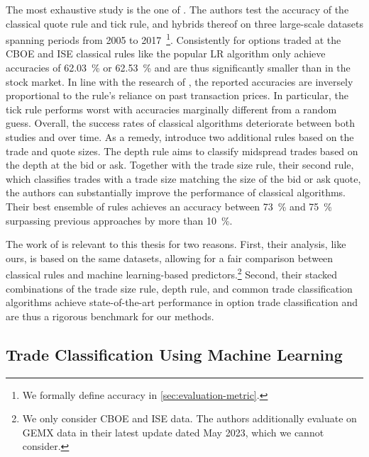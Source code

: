 The most exhaustive study is the one of \textcite[\checkmark][1--53]{grauerOptionTradeClassification2022}. The authors test the accuracy of the classical quote rule and tick rule, and hybrids thereof on three large-scale datasets spanning periods from 2005 to 2017~\footnote{We formally define accuracy in \cref{sec:evaluation-metric}.}. Consistently for options traded at the \gls{CBOE} and \gls{ISE} classical rules like the popular \gls{LR}  algorithm only achieve accuracies of \SI{62.03}{\percent} or \SI{62.53}{\percent} and are thus significantly smaller than in the stock market. In line with the research of \textcite[\checkmark][886]{savickasInferringDirectionOption2003}, the reported accuracies are inversely proportional to the rule's reliance on past transaction prices. In particular, the tick rule performs worst with accuracies marginally different from a random guess. Overall, the success rates of classical algorithms deteriorate between both studies and over time. As a remedy, \textcite[][13--15]{grauerOptionTradeClassification2022} introduce two additional rules based on the trade and quote sizes. The depth rule aims to classify midspread trades based on the depth at the bid or ask. Together with the trade size rule, their second rule, which classifies trades with a trade size matching the size of the bid or ask quote, the authors can substantially improve the performance of classical algorithms. Their best ensemble of rules achieves an accuracy between \SI{73}{\percent} and \SI{75}{\percent} surpassing previous approaches by more than \SI{10}{\percent}.

The work of \textcite[\checkmark][1--53]{grauerOptionTradeClassification2022} is relevant to this thesis for two reasons. First, their analysis, like ours, is based on the same datasets, allowing for a fair comparison between classical rules and machine learning-based predictors.\footnote{We only consider \gls{CBOE} and \gls{ISE} data. The authors additionally evaluate on GEMX data in their latest update dated May 2023, which we cannot consider.} Second, their stacked combinations of the trade size rule, depth rule, and common trade classification algorithms achieve state-of-the-art performance in option trade classification and are thus a rigorous benchmark for our methods.

\subsection{Trade Classification Using Machine Learning}
\label{sec:trade-classification-using-machine-learning}

